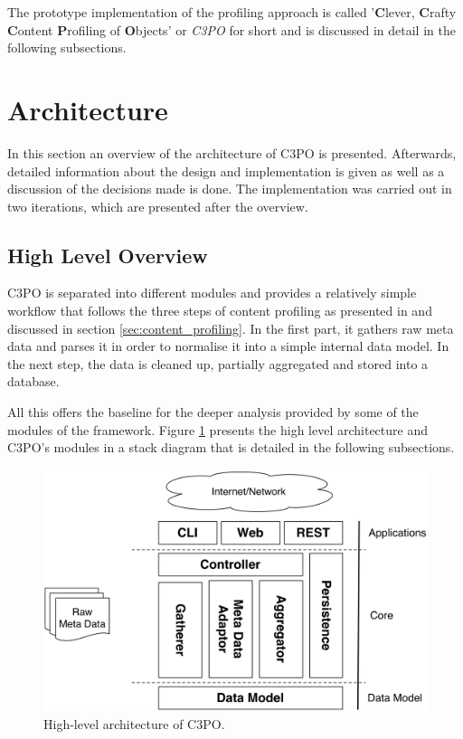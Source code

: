 The prototype implementation of the profiling approach is called '\textbf{C}lever, \textbf{C}rafty \textbf{C}ontent \textbf{P}rofiling of \textbf{O}bjects' or \textit{C3PO} for short and is discussed in detail in the following subsections.

\section{Architecture}
In this section an overview of the architecture of C3PO is presented. Afterwards, detailed information about the design and implementation is given as well as a discussion of the decisions made is done. The implementation was carried out in two iterations, which are presented after the overview.

\subsection{High Level Overview}
C3PO is separated into different modules and provides a relatively simple workflow that follows the three steps of content profiling as presented in \cite{petrov-ipres2012} and discussed in section \ref{sec:content_profiling}. In the first part, it gathers raw meta data and parses it in order to normalise it into a simple internal data model. In the next step, the data is cleaned up, partially aggregated and stored into a database.

All this offers the baseline for the deeper analysis provided by some of the modules of the framework. Figure \ref{fig:architecture_highlevel} presents the high level architecture and C3PO's modules in a stack diagram that is detailed in the following subsections.


\begin{figure}[t]
\begin{center}
\includegraphics[width=5in]{figures/architecture/c3po_highlevel_architecture.png}
\caption{High-level architecture of C3PO.}
\label{fig:architecture_highlevel}
\end{center}
\end{figure}


